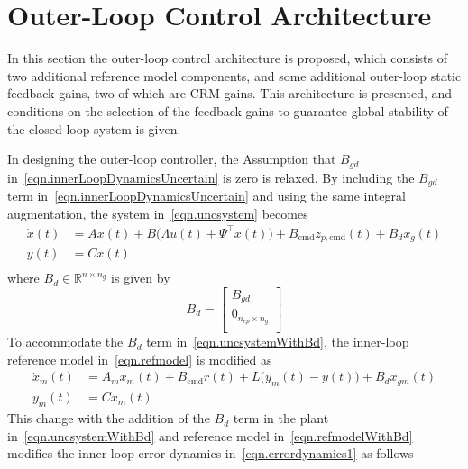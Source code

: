 \section{Outer-Loop Control Architecture}

In this section the outer-loop control architecture is proposed, which consists of two additional reference model components, and some additional outer-loop static feedback gains, two of which are CRM gains.
This architecture is presented, and conditions on the selection of the feedback gains to guarantee global stability of the closed-loop system is given.

In designing the outer-loop controller, the Assumption that $B_{gd}$ in\ \eqref{eqn.innerLoopDynamicsUncertain} is zero is relaxed.
By including the $B_{gd}$ term in\ \eqref{eqn.innerLoopDynamicsUncertain} and using the same integral augmentation, the system in\ \eqref{eqn.uncsystem} becomes
\begin{equation}
  \label{eqn.uncsystemWithBd}
  \begin{split}
    \dot{x}(t) &= Ax(t) + B\bigr(\Lambda u(t)+\Psi^{\top}x(t)\bigr)+B_{\text{cmd}}z_{p,\text{cmd}}(t) + B_{d}x_{g}(t) \\
    y(t) &= Cx(t) \\
  \end{split}
\end{equation}
where $B_{d}\in\mathbb{R}^{n\times n_{g}}$ is given by
\begin{equation*}
  B_{d} =
  \begin{bmatrix}
    B_{gd} \\
    0_{n_{ep}\times n_{g}} \\
  \end{bmatrix}
\end{equation*}
To accommodate the $B_{d}$ term in\ \eqref{eqn.uncsystemWithBd}, the inner-loop reference model in\ \eqref{eqn.refmodel} is modified as
\begin{equation}
  \label{eqn.refmodelWithBd}
  \begin{split}
    \dot{x}_{m}(t) &= A_{m}x_{m}(t) + B_{\text{cmd}}r(t) + L\bigr(y_{m}(t)-y(t)\bigr) + B_{d}x_{gm}(t) \\
    y_{m}(t) &= Cx_{m}(t)
  \end{split}
\end{equation}
This change with the addition of the $B_{d}$ term in the plant in\ \eqref{eqn.uncsystemWithBd} and reference model in\ \eqref{eqn.refmodelWithBd} modifies the inner-loop error dynamics in\ \eqref{eqn.errordynamics1} as follows
